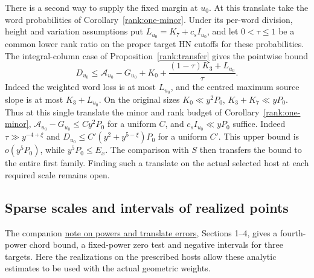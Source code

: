 There is a second way to supply the fixed margin at \(u_0\).
At this translate take the word probabilities of
Corollary~\ref{rank:one-minor}. Under its per-word division, height and
variation assumptions put \(L_{u_0}=K_7+c_s I_{u_0}\), and let
\(0<\tau\le1\) be a common lower rank ratio on the proper target HN
cutoffs for these probabilities. The integral-column case of
Proposition~\ref{rank:transfer} gives the pointwise bound
\[
 D_{u_0}\le \mathcal A_{u_0}-G_{u_0}+K_0+
                 \frac{(1-\tau)K_3+L_{u_0}}{\tau}.
\]
Indeed the weighted word loss is at most \(L_{u_0}\), and the centred
maximum source slope is at most \(K_3+L_{u_0}\). On the original
sizes \(K_0\ll y^2P_0\), \(K_3+K_7\ll yP_0\). Thus at this single
translate the minor and rank budget of Corollary~\ref{rank:one-minor},
\(\mathcal A_{u_0}-G_{u_0}\le C y^2P_0\) for a uniform \(C\), and
\(c_s I_{u_0}\ll yP_0\) suffice. Indeed \(\tau\gg y^{-4+\xi}\)
and \(D_{u_0}\le C'(y^2+y^{5-\xi})P_0\) for a uniform \(C'\).
This upper bound is \(o(y^5P_0)\), while \(y^5P_0\le E_x\).
The comparison with \(S\) then transfers
the bound to the entire first family. Finding such a translate
on the actual selected host at each required scale remains open.

\subsection{Sparse scales and intervals of realized points}\label{scope:sparse-scales}
The companion \href{15-1-15-2-2026-11-22.pdf}{note on powers and
translate errors}, Sections 1--4, gives a fourth-power chord bound,
a fixed-power zero test and negative intervals for three targets.
Here the realizations on the prescribed hosts allow these analytic
estimates to be used with the actual geometric weights.

